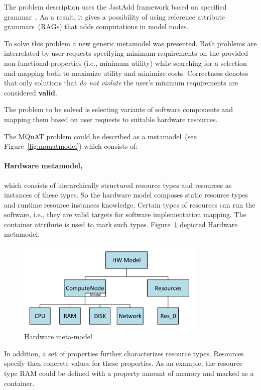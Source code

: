 The problem description uses the JastAdd framework\cite{ekman07} based on specified grammar~\cite{gotz2018JastAdd}. Aa a result, it gives a possibility of using reference attribute grammars~(RAGs)\cite{hedin2000} that adds computations in model nodes.

To solve this problem a new generic metamodel was presented. Both problems are interrelated by user requests specifying minimum requirements on the provided non-functional properties (i.e., minimum utility) while searching for a selection and mapping both to maximize utility and minimize costs. Correctness denotes that only solutions that \textit{do not violate} the user's minimum requirements are considered \textbf{valid}.

The problem to be solved is selecting variants of software components and mapping them based on user requests to suitable hardware resources.


The MQuAT problem could be described as a metamodel~(see Figure~\ref{fig:mquatmodel}) which consists of:
\paragraph{Hardware metamodel,}which consists of hierarchically structured resource types and resources as instances of these types. So the hardware model composes static resource types and runtime resource instances knowledge. Certain types of resources can run the software, i.e., they are valid targets for software implementation mapping. The container attribute is used to mark such types. Figure~\ref{fig:HWmodel} depicted Hardware metamodel.

\begin{figure}
	\centering
	\includegraphics[width=0.8\textwidth]{images/HWModel.pdf}
	\caption[Hardware meta-model]{Hardware meta-model}
	\label{fig:HWmodel}
\end{figure}


In addition, a set of properties further characterizes resource types. Resources specify then concrete values for these properties. As an example, the resource type RAM could be defined with a property amount of memory and marked as a container.

